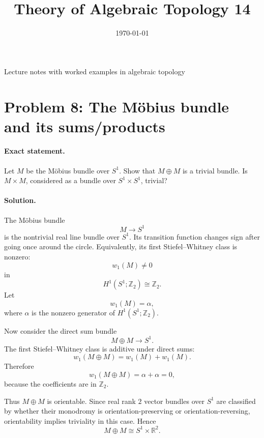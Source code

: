 \documentclass[12pt,a4paper]{article}
\title{\vspace{-1.5em}\bfseries Theory of Algebraic Topology 14}
\author{}
\date{\today}
\theoremstyle{notespace}
\begin{document}
	\maketitle
	\thispagestyle{plain}
		\begin{center}
		\begin{minipage}{0.92\textwidth}
			Lecture notes with worked examples in algebraic topology
		\end{minipage}
	\end{center}
		\tableofcontents
	\clearpage

	
	
	\section{Problem 8: The M\"obius bundle and its sums/products}
	
	\paragraph{Exact statement.}
	Let \(M\) be the M\"obius bundle over \(S^{1}\). Show that \(M\oplus M\) is a trivial bundle. Is \(M\times M\), considered as a bundle over \(S^{1}\times S^{1}\), trivial?
	
	\paragraph{Solution.}
	The M\"obius bundle
	\[
	M\to S^{1}
	\]
	is the nontrivial real line bundle over \(S^{1}\). Its transition function changes sign after going once around the circle. Equivalently, its first Stiefel--Whitney class is nonzero:
	\[
	w_{1}(M)\neq 0
	\]
	in
	\[
	H^{1}(S^{1};\mathbb Z_{2})\cong \mathbb Z_{2}.
	\]
	Let
	\[
	w_{1}(M)=\alpha,
	\]
	where \(\alpha\) is the nonzero generator of \(H^{1}(S^{1};\mathbb Z_{2})\).
	
	Now consider the direct sum bundle
	\[
	M\oplus M\to S^{1}.
	\]
	The first Stiefel--Whitney class is additive under direct sums:
	\[
	w_{1}(M\oplus M)
	=
	w_{1}(M)+w_{1}(M).
	\]
	Therefore
	\[
	w_{1}(M\oplus M)
	=
	\alpha+\alpha
	=
	0,
	\]
	because the coefficients are in \(\mathbb Z_{2}\).
	
	Thus \(M\oplus M\) is orientable. Since real rank \(2\) vector bundles over \(S^{1}\) are classified by whether their monodromy is orientation-preserving or orientation-reversing, orientability implies triviality in this case. Hence
	\[
	M\oplus M\cong S^{1}\times \mathbb R^{2}.
	\]
	
\end{document}
